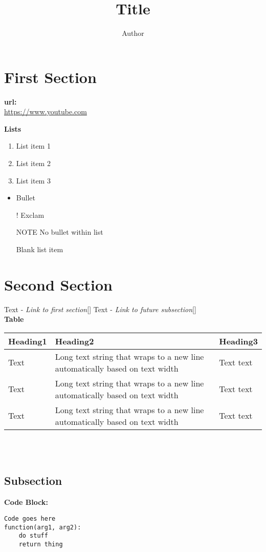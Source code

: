 \documentclass{article}
\title{Title}
\author{Author}
\begin{document}
\maketitle
\tableofcontents


\section*{First Section}
\label{s:first}

\textbf{url:}\\
\url{https://www.youtube.com}

\textbf{Lists}\\
\begin{enumerate}
    \item List item 1
    \item List item 2
    \item List item 3
\end{enumerate}
\begin{itemize}
    \item Bullet
    \item[!] Exclam
    \item[NOTE] No bullet within list
    \item[] Blank list item
\end{itemize}

\section*{Second Section}
\label{s:second}

Text - \textit{Link to first section}[]
Text - \textit{Link to future subsection}[]
\\

\textbf{Table}\\
\begin{tabularx}{\textwidth}{ | >{\hsize}Y | Y | >{\hsize}Y | }
    \hline
    Heading1 & Heading2 & Heading3 \\
    \hline
    Text & Long text string that wraps to a new line automatically based on text width & Text text \\
    \hline
    Text & Long text string that wraps to a new line automatically based on text width & Text text \\
    \hline
    Text & Long text string that wraps to a new line automatically based on text width & Text text \\
    \hline
\end{tabularx}\\
\\


\subsection*{Subsection}
\label{ss:subsection}

\textbf{Code Block:}
\begin{verbatim}
Code goes here
function(arg1, arg2):
    do stuff
    return thing
\end{verbatim}
\end{document}
